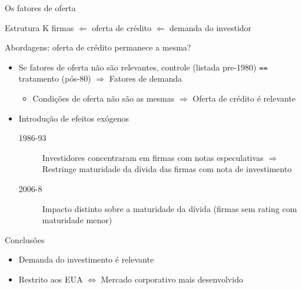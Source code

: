 \documentclass[presentation]{beamer}
\begin{document}
\begin{frame}[label={sec:org14c6838},fragile]{Os fatores de oferta}
 \begin{center}
Estrutura K firmas \(\Leftarrow\) oferta de crédito \(\Leftarrow\) demanda do investidor
\end{center}

\begin{block}{Abordagens: oferta de crédito permanece a mesma?}
\begin{itemize}
\item Se fatores de oferta não são relevantes, controle (listada pre-1980) \texttt{==}  tratamento (pós-80) \(\Rightarrow\) Fatores de demanda
\begin{itemize}
\item Condições de oferta não são as mesmas \(\Rightarrow\) Oferta de crédito é relevante
\end{itemize}
\item Introdução de efeitos exógenos
\begin{description}
\item[{1986-93}] Investidores concentraram em firmas com notas especulativas \(\Rightarrow\) Restringe maturidade da dívida das firmas com nota de investimento
\item[{2006-8}] Impacto distinto sobre a maturidade da dívida (firmas sem rating com maturidade menor)
\end{description}
\end{itemize}
\end{block}

\begin{block}{Conclusões}
\begin{itemize}
\item Demanda do investimento é relevante
\item Restrito aos EUA \(\Leftrightarrow\) Mercado corporativo mais desenvolvido
\end{itemize}
\end{block}
\end{frame}
\end{document}
